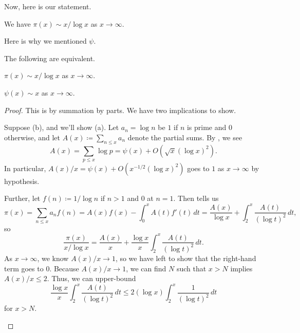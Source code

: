 \documentclass[../notes.tex]{subfiles}
\begin{document}
Now, here is our statement.
\begin{theorem}
	We have $\pi(x)\sim x/\log x$ as $x\to\infty$.
\end{theorem}
Here is why we mentioned $\psi$.
\begin{proposition}
	The following are equivalent.
	\begin{listalph}
		\item $\pi(x)\sim x/\log x$ as $x\to\infty$.
		\item $\psi(x)\sim x$ as $x\to\infty$.
	\end{listalph}
\end{proposition}
\begin{proof}
	This is by summation by parts. We have two implications to show.
	\begin{listalph}
		\item Suppose (b), and we'll show (a). Let $a_n=\log n$ be $1$ if $n$ is prime and $0$ otherwise, and let $A(x)\coloneqq\sum_{n\le x}a_n$ denote the partial sums. By , we see
		\[A(x)=\sum_{p\le x}\log p=\psi(x)+O\left(\sqrt x(\log x)^2\right).\]
		In particular, $A(x)/x=\psi(x)+O\left(x^{-1/2}(\log x)^2\right)$ goes to $1$ as $x\to\infty$ by hypothesis.

		Further, let $f(n)\coloneqq1/\log n$ if $n>1$ and $0$ at $n=1$. Then  tells us
		\[\pi(x)=\sum_{n\le x}a_nf(n)=A(x)f(x)-\int_0^xA(t)f'(t)\,dt=\frac{A(x)}{\log x}+\int_2^x\frac{A(t)}{(\log t)^2}\,dt,\]
		so
		\[\frac{\pi(x)}{x/\log x}=\frac{A(x)}{x}+\frac{\log x}x\int_2^x\frac{A(t)}{(\log t)^2}\,dt.\]
		As $x\to\infty$, we know $A(x)/x\to 1$, so we have left to show that the right-hand term goes to $0$. Because $A(x)/x\to1$, we can find $N$ such that $x>N$ implies $A(x)/x\le2$. Thus, we can upper-bound
		\[\frac{\log x}x\int_2^x\frac{A(t)}{(\log t)^2}\,dt\le2(\log x)\int_2^x\frac1{(\log t)^2}\,dt\]
		for $x>N$.\todo{}
	\end{listalph}
\end{proof}
\end{document}
